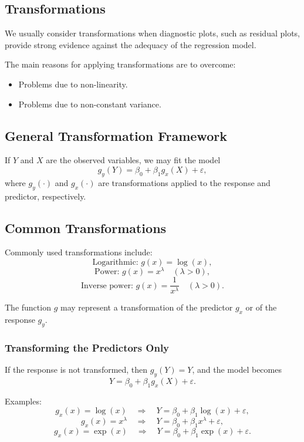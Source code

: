 \subsection{Transformations}

We usually consider transformations when diagnostic plots, such as residual plots, provide strong evidence against the adequacy of the regression model.

The main reasons for applying transformations are to overcome:
\begin{itemize}
  \item Problems due to non-linearity.
  \item Problems due to non-constant variance.
\end{itemize}

\subsection{General Transformation Framework}

If $Y$ and $X$ are the observed variables, we may fit the model
\[
g_y(Y) = \beta_0 + \beta_1 g_x(X) + \varepsilon,
\]
where $g_y(\cdot)$ and $g_x(\cdot)$ are transformations applied to the response and predictor, respectively.

\subsection{Common Transformations}

Commonly used transformations include:
\[
\text{Logarithmic: } g(x) = \log(x),
\]
\[
\text{Power: } g(x) = x^\lambda \quad (\lambda > 0),
\]
\[
\text{Inverse power: } g(x) = \frac{1}{x^\lambda} \quad (\lambda > 0).
\]

The function $g$ may represent a transformation of the predictor $g_x$ or of the response $g_y$.

\subsubsection{Transforming the Predictors Only}

If the response is not transformed, then $g_y(Y) = Y$, and the model becomes
\[
Y = \beta_0 + \beta_1 g_x(X) + \varepsilon.
\]

Examples:
\[
g_x(x) = \log(x) \quad \Rightarrow \quad Y = \beta_0 + \beta_1 \log(x) + \varepsilon,
\]
\[
g_x(x) = x^\lambda \quad \Rightarrow \quad Y = \beta_0 + \beta_1 x^\lambda + \varepsilon,
\]
\[
g_x(x) = \exp(x) \quad \Rightarrow \quad Y = \beta_0 + \beta_1 \exp(x) + \varepsilon.
\]

